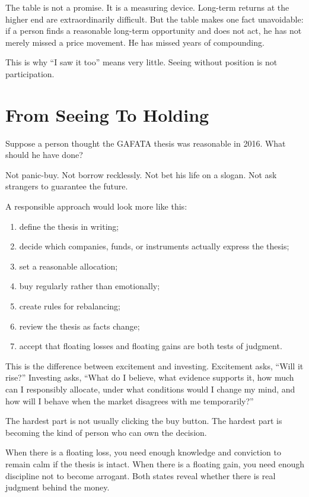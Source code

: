 The table is not a promise. It is a measuring device. Long-term returns at the higher end are extraordinarily difficult. But the table makes one fact unavoidable: if a person finds a reasonable long-term opportunity and does not act, he has not merely missed a price movement. He has missed years of compounding.

This is why ``I saw it too'' means very little. Seeing without position is not participation.

\section*{From Seeing To Holding}

Suppose a person thought the GAFATA thesis was reasonable in 2016. What should he have done?

Not panic-buy. Not borrow recklessly. Not bet his life on a slogan. Not ask strangers to guarantee the future.

A responsible approach would look more like this:

\begin{enumerate}
\item define the thesis in writing;
\item decide which companies, funds, or instruments actually express the thesis;
\item set a reasonable allocation;
\item buy regularly rather than emotionally;
\item create rules for rebalancing;
\item review the thesis as facts change;
\item accept that floating losses and floating gains are both tests of judgment.
\end{enumerate}

This is the difference between excitement and investing. Excitement asks, ``Will it rise?'' Investing asks, ``What do I believe, what evidence supports it, how much can I responsibly allocate, under what conditions would I change my mind, and how will I behave when the market disagrees with me temporarily?''

The hardest part is not usually clicking the buy button. The hardest part is becoming the kind of person who can own the decision.

When there is a floating loss, you need enough knowledge and conviction to remain calm if the thesis is intact. When there is a floating gain, you need enough discipline not to become arrogant. Both states reveal whether there is real judgment behind the money.

